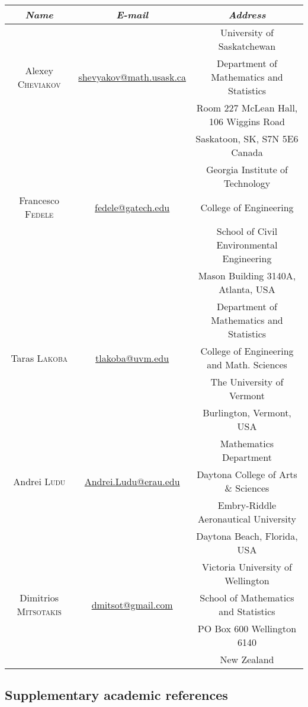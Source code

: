 \documentclass[final, a4paper, oneside, 12pt]{article}
\numberwithin{equation}{section}
\begin{document}
\begin{adjustwidth}{-1cm}{}
\begin{tabular}{ccc}
\hline\hline
\textit{Name} & \textit{E-mail} & \textit{Address} \\
\hline\hline 
 & & University of Saskatchewan \\
Alexey \textsc{Cheviakov} & \href{mailto:shevyakov@math.usask.ca}{shevyakov@math.usask.ca} & Department of Mathematics and Statistics \\
& & Room 227 McLean Hall, 106 Wiggins Road \\
& & Saskatoon, SK, S7N 5E6 Canada \\
\hline
 & & Georgia Institute of Technology \\
Francesco \textsc{Fedele} & \href{mailto:fedele@gatech.edu}{fedele@gatech.edu} & College of Engineering \\
& & School of Civil Environmental Engineering \\
& & Mason Building 3140A, Atlanta, USA \\
\hline
& & Department of Mathematics and Statistics \\
Taras \textsc{Lakoba} & \href{mailto:tlakoba@uvm.edu}{tlakoba@uvm.edu} & College of Engineering and Math. Sciences \\
& & The University of Vermont \\
& & Burlington, Vermont, USA \\
\hline
& & Mathematics Department \\
Andrei \textsc{Ludu} & \href{mailto:Andrei.Ludu@erau.edu}{Andrei.Ludu@erau.edu} & Daytona College of Arts \& Sciences \\
& & Embry-Riddle Aeronautical University \\
& & Daytona Beach, Florida, USA \\
\hline
 & & Victoria University of Wellington \\
Dimitrios \textsc{Mitsotakis} & \href{mailto:dmitsot@gmail.com}{dmitsot@gmail.com} & School of Mathematics and Statistics \\
& & PO Box 600 Wellington 6140 \\
& & New Zealand \\
\hline\hline
\end{tabular}
\end{adjustwidth}

\subsection{Supplementary academic references}
\end{document}
